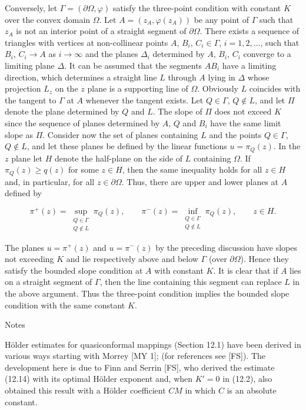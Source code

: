 Conversely, let $\Gamma = (\partial \Omega, \varphi)$ satisfy the three-point
condition with constant $K$ over the convex domain $\Omega$. Let
$A = (z_A, \varphi(z_A))$ be any point of $\Gamma$ such that $z_A$ is not an
interior point of a straight segment of $\partial \Omega$. There exists a
sequence of triangles with vertices at non-collinear points $A$, $B_i$, $C_i \in
\Gamma$, $i = 1, 2, \ldots$, such that $B_i$, $C_i \to A$ as $i \to \infty$
and the planes $\Delta_i$ determined by $A$, $B_i$, $C_i$ converge to a
limiting plane $\Delta$. It can be assumed that the segments $AB_i$ have a
limiting direction, which determines a straight line $L$ through $A$ lying in
$\Delta$ whose projection $L_z$ on the $z$ plane is a supporting line of
$\Omega$. Obviously $L$ coincides with the tangent to $\Gamma$ at $A$
whenever the tangent exists. Let $Q \in \Gamma$, $Q \notin L$, and let $\Pi$
denote the plane determined by $Q$ and $L$. The slope of $\Pi$ does not exceed
$K$ since the sequence of planes determined by $A$, $Q$ and $B_i$ have the same
limit slope as $\Pi$. Consider now the set of planes containing $L$ and the
points $Q \in \Gamma$, $Q \notin L$, and let these planes be defined by the
linear functions $u = \pi_Q(z)$. In the $z$ plane let $H$ denote the half-plane
on the side of $L$ containing $\Omega$. If $\pi_Q(z) \ge q(z)$ for some
$z \in H$, then the same inequality holds for all $z \in H$ and, in
particular, for all $z \in \partial \Omega$. Thus, there are upper and lower
planes at $A$ defined by

\[
\pi^+(z) = \sup_{\substack{Q \in \Gamma \\ Q \notin L}} \pi_Q(z), \qquad
\pi^-(z) = \inf_{\substack{Q \in \Gamma \\ Q \notin L}} \pi_Q(z), \qquad z \in H.
\]

The planes $u = \pi^+(z)$ and $u = \pi^-(z)$ by the preceding discussion have
slopes not exceeding $K$ and lie respectively above and below $\Gamma$ (over
$\partial \Omega$). Hence they satisfy the bounded slope condition at $A$ with
constant $K$. It is clear that if $A$ lies on a straight segment of $\Gamma$,
then the line containing this segment can replace $L$ in the above argument.
Thus the three-point condition implies the bounded slope condition with the
same constant $K$.

Notes

Hölder estimates for quasiconformal mappings (Section 12.1) have been derived
in various ways starting with Morrey [MY 1]; (for references see [FS]). The
development here is due to Finn and Serrin [FS], who derived the estimate
(12.14) with its optimal Hölder exponent and, when $K' = 0$ in (12.2), also
obtained this result with a Hölder coefficient $CM$ in which $C$ is an absolute
constant.

